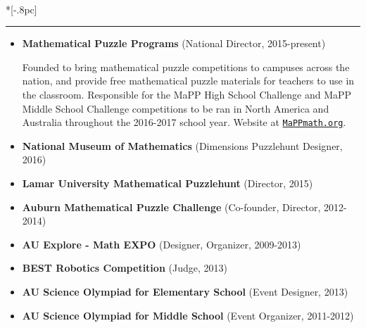 \documentclass{article}
\newcommand{\headerText}[1]{
  \noindent{\large \bf #1} \\*[-.8pc]
  \rule{\textwidth}{.1pt}}
\begin{document}
\vfill


\headerText{Outreach}
\begin{itemize}

  \item
    \textbf{Mathematical Puzzle Programs} (National Director, 2015-present)


    Founded to bring mathematical puzzle competitions
    to campuses across the nation, and provide free mathematical puzzle
    materials for teachers to use in the classroom.
    Responsible for the MaPP High School
    Challenge and MaPP Middle School Challenge competitions to be ran
    in North America and Australia throughout the 2016-2017 school year.
    Website at
    \href{http://www.mappmath.org}{\nolinkurl{MaPPmath.org}}.

  \item
    \textbf{National Museum of Mathematics}
        (Dimensions Puzzlehunt Designer, 2016)

  \item
    \textbf{Lamar University Mathematical Puzzlehunt} (Director, 2015)


  \item
    \textbf{Auburn Mathematical Puzzle Challenge} (Co-founder, Director, 2012-2014)


  \item
    \textbf{AU Explore - Math EXPO} (Designer, Organizer, 2009-2013)


  \item
    \textbf{BEST Robotics Competition} (Judge, 2013)

  \item
    \textbf{AU Science Olympiad for Elementary School} (Event Designer, 2013)

  \item
    \textbf{AU Science Olympiad for Middle School} (Event Organizer, 2011-2012)
\end{itemize}
\end{document}
